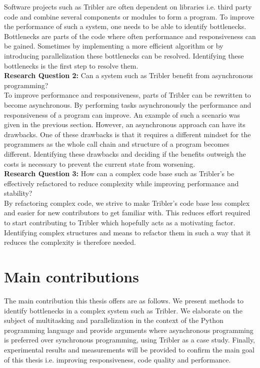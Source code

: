 Software projects such as Tribler are often dependent on libraries i.e. third party code and combine several components or modules to form a program.
To improve the performance of such a system, one needs to be able to identify bottlenecks.
Bottlenecks are parts of the code where often performance and responsiveness can be gained. 
Sometimes by implementing a more efficient algorithm or by introducing parallelization these bottlenecks can be resolved.
Identifying these bottlenecks is the first step to resolve them.\\

\textbf{Research Question 2:} Can a system such as Tribler benefit from asynchronous programming?\\

To improve performance and responsiveness, parts of Tribler can be rewritten to become asynchronous.
By performing tasks asynchronously the performance and responsiveness of a program can improve. 
An example of such a scenario was given in the previous section.
However, an asynchronous approach can have its drawbacks. 
One of these drawbacks is that it requires a different mindset for the programmers as the whole call chain and structure of a program becomes different.
Identifying these drawbacks and deciding if the benefits outweigh the costs is necessary to prevent the current state from worsening. \\

\noindent
\textbf{Research Question 3:} How can a complex code base such as Tribler's be effectively refactored to reduce complexity while improving performance and stability?\\

By refactoring complex code, we strive to make Tribler's code base less complex and easier for new contributors to get familiar with.
This reduces effort required to start contributing to Tribler which hopefully acts as a motivating factor.
Identifying complex structures and means to refactor them in such a way that it reduces the complexity is therefore needed.

\section{Main contributions}
The main contribution this thesis offers are as follows. We present methods to identify bottlenecks in a complex system such as Tribler. 
We elaborate on the subject of multitasking and parallelization in the context of the Python programming language and provide arguments where asynchronous programming is preferred over synchronous programming, using Tribler as a case study.
Finally, experimental results and measurements will be provided to confirm the main goal of this thesis i.e. improving responsiveness, code quality and performance.